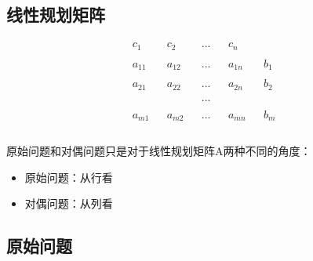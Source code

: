 		\subsection{线性规划矩阵}
			\[
			\begin{array}{rrrrrrrrrrrrl}
     			& c_1    & &  c_2    & &  ...& & c_n     &      &    & \\
      			&   & & & & & & & & & \\
      			& a_{11}  & & a_{12}  & & ... & & a_{1n} &   & b_1 &  \\
           		&   & & & & & & & & & \\
      			& a_{21} & & a_{22}  & & ... & & a_{2n}  &   & b_2 &  \\
             	&   & & & & & & & & & \\
      			&           & &           & & ... & &           &      &     &  \\
             	&   & & & & & & & & & \\
      			& a_{m1} & & a_{m2}  & & ... & & a_{mn}  &  & b_m &  \\
         	\end{array} \nonumber
			\]
			
			\paragraph{}原始问题和对偶问题只是对于线性规划矩阵A两种不同的角度：
			\begin{itemize}
				\item 原始问题：从行看
				\item 对偶问题：从列看
			\end{itemize}
		\subsection{原始问题}
